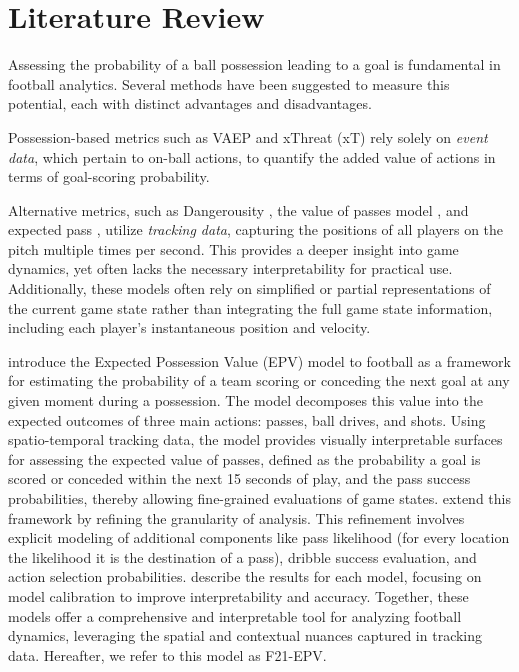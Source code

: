 \section{Literature Review} \label{literature_review}

Assessing the probability of a ball possession leading to a goal is fundamental in football analytics. Several methods have been suggested to measure this potential, each with distinct advantages and disadvantages.

Possession-based metrics such as VAEP \citep{VAEP2019} and xThreat (xT) \citep{singh} rely solely on \textit{event data}, which pertain to on-ball actions, to quantify the added value of actions in terms of goal-scoring probability.

Alternative metrics, such as Dangerousity \citep{Link2016}, the value of passes model \citep{Power2017}, and expected pass \citep{anzer2022expected}, utilize \textit{tracking data}, capturing the positions of all players on the pitch multiple times per second. This provides a deeper insight into game dynamics, yet often lacks the necessary interpretability for practical use. Additionally, these models often rely on simplified or partial representations of the current game state rather than integrating the full game state information, including each player's instantaneous position and velocity.

\cite{fernandez2019decomposing} introduce the Expected Possession Value (EPV) model to football as a framework for estimating the probability of a team scoring or conceding the next goal at any given moment during a possession. The model decomposes this value into the expected outcomes of three main actions: passes, ball drives, and shots. Using spatio-temporal tracking data, the model provides visually interpretable surfaces for assessing the expected value of passes, defined as the probability a goal is scored or conceded within the next 15 seconds of play, and the pass success probabilities, thereby allowing fine-grained evaluations of game states. \cite{Fernández2021} extend this framework by refining the granularity of analysis. This refinement involves explicit modeling of additional components like pass likelihood (for every location the likelihood it is the destination of a pass), dribble success evaluation, and action selection probabilities. \cite{Fernández2021} describe the results for each model, focusing on model calibration to improve interpretability and accuracy. Together, these models offer a comprehensive and interpretable tool for analyzing football dynamics, leveraging the spatial and contextual nuances captured in tracking data. Hereafter, we refer to this model as F21-EPV.

